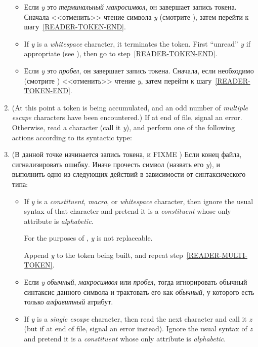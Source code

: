 \begin{enumerate}
\begin{itemize}
\item Если \emph{y} это \emph{терминальный макросимвол}, он завершает
  запись токена. Сначала <<отменить>> чтение символа \emph{y}
  (смотрите ), затем перейти к шагу~\ref{READER-TOKEN-END}.

\item
If \emph{y} is a \emph{whitespace} character, it terminates
the token.  First ``unread'' \emph{y}
if appropriate (see ),
then go to step~\ref{READER-TOKEN-END}.

\item Если \emph{y} это \emph{пробел}, он завершает запись
  токена. Сначала, если необходимо (смотрите
  ) <<отменить>> чтение \emph{y},
  затем перейти к шагу~\ref{READER-TOKEN-END}.
\end{itemize}

\item
(At this point a token is being accumulated, and an odd number
of \emph{multiple escape} characters have been encountered.)
If at end of file, signal an error.
Otherwise, read a character (call it \emph{y}), and
perform one of the following actions according to its syntactic type:
\label{READER-MULTI-TOKEN}

\item (В данной точке начинается запись токена, и FIXME ) Если конец
  файла, сигнализировать ошибку. Иначе прочесть символ (назвать его
  \emph{y}), и выполнить одно из следующих действий в зависимости от
  синтаксического типа:
\label{READER-MULTI-TOKEN}
\begin{itemize}
\item
If \emph{y} is a \emph{constituent}, \emph{macro}, or \emph{whitespace}
character, then ignore the usual syntax of that character
and pretend it is a \emph{constituent} whose only attribute is
\emph{alphabetic}.

For the purposes of , \emph{y} is not replaceable.

Append \emph{y} to the token being built,
and repeat step~\ref{READER-MULTI-TOKEN}.

\item Если \emph{y} \emph{обычный}, \emph{макросимвол} или
  \emph{пробел}, тогда игнорировать обычный синтаксис данного символа
  и трактовать его как \emph{обычный}, у которого есть только
  \emph{алфавитный} атрибут.

\item
If \emph{y} is a \emph{single escape} character, then read the next character
and call it \emph{z}
(but if at end of file, signal an error instead).
Ignore the usual syntax of \emph{z}
and pretend it is a \emph{constituent} whose only attribute is
\emph{alphabetic}.


\end{itemize}
\end{enumerate}
